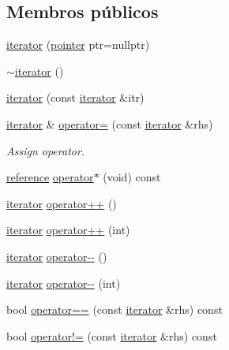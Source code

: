 \subsection*{Membros públicos}
\begin{DoxyCompactItemize}
\item 
\mbox{\hyperlink{classsc_1_1vector_1_1iterator_a98c81d1f7e22a53be1a4d571f312a765}{iterator}} (\mbox{\hyperlink{classsc_1_1vector_1_1iterator_a518f02aadbb3fd937bdbda24120d2678}{pointer}} ptr=nullptr)
\item 
\mbox{\hyperlink{classsc_1_1vector_1_1iterator_ade6d4199568c72dc21820a63dd3e19f8}{$\sim$iterator}} ()
\item 
\mbox{\hyperlink{classsc_1_1vector_1_1iterator_af4c2845a66919933ab809508a7acf3a6}{iterator}} (const \mbox{\hyperlink{classsc_1_1vector_1_1iterator}{iterator}} \&itr)
\item 
\mbox{\hyperlink{classsc_1_1vector_1_1iterator}{iterator}} \& \mbox{\hyperlink{classsc_1_1vector_1_1iterator_afbc7dcbcd6f36d53176b749c2b4641dc}{operator=}} (const \mbox{\hyperlink{classsc_1_1vector_1_1iterator}{iterator}} \&rhs)
\begin{DoxyCompactList}\small\item\em Assign operator. \end{DoxyCompactList}\item 
\mbox{\hyperlink{classsc_1_1vector_1_1iterator_a266d58fdf67f2129ef3dc99efd652e15}{reference}} \mbox{\hyperlink{classsc_1_1vector_1_1iterator_a2a4311547c42a72ef8ac29e0a6190df7}{operator$\ast$}} (void) const
\item 
\mbox{\hyperlink{classsc_1_1vector_1_1iterator}{iterator}} \mbox{\hyperlink{classsc_1_1vector_1_1iterator_a954d15e99dd86994ca084958c38e3596}{operator++}} ()
\item 
\mbox{\hyperlink{classsc_1_1vector_1_1iterator}{iterator}} \mbox{\hyperlink{classsc_1_1vector_1_1iterator_a780e857e3c00f2f6dbe678260da89728}{operator++}} (int)
\item 
\mbox{\hyperlink{classsc_1_1vector_1_1iterator}{iterator}} \mbox{\hyperlink{classsc_1_1vector_1_1iterator_a92b5218f5e8445568fb8f82fee7bfe8e}{operator-\/-\/}} ()
\item 
\mbox{\hyperlink{classsc_1_1vector_1_1iterator}{iterator}} \mbox{\hyperlink{classsc_1_1vector_1_1iterator_a58cbdffc1cc240313c672f60ff7ded19}{operator-\/-\/}} (int)
\item 
bool \mbox{\hyperlink{classsc_1_1vector_1_1iterator_a2beb436266683c273335e69c7d26ce2c}{operator==}} (const \mbox{\hyperlink{classsc_1_1vector_1_1iterator}{iterator}} \&rhs) const
\item 
bool \mbox{\hyperlink{classsc_1_1vector_1_1iterator_a4369c4ee1b1d5f03f6e524eef07b905c}{operator!=}} (const \mbox{\hyperlink{classsc_1_1vector_1_1iterator}{iterator}} \&rhs) const
\end{DoxyCompactItemize}


